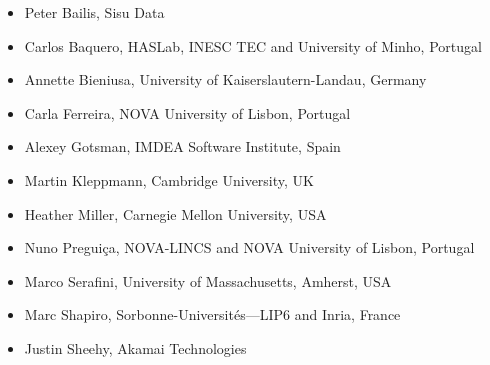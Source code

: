 \documentclass[acmsmall,nonacm]{acmart}
\begin{document}
\begin{itemize}
\item Peter Bailis, Sisu Data
\item Carlos Baquero, HASLab, INESC TEC and University of Minho, Portugal
\item Annette Bieniusa, University of Kaiserslautern-Landau, Germany
\item Carla Ferreira, NOVA University of Lisbon, Portugal
\item Alexey Gotsman, IMDEA Software Institute, Spain
\item Martin Kleppmann, Cambridge University, UK
\item Heather Miller, Carnegie Mellon University, USA
\item Nuno Preguiça, NOVA-LINCS and NOVA University of Lisbon, Portugal
\item Marco Serafini, University of Massachusetts, Amherst, USA
\item Marc Shapiro, Sorbonne-Universités—LIP6 and Inria, France
\item Justin Sheehy, Akamai Technologies
\end{itemize}
\end{document}
